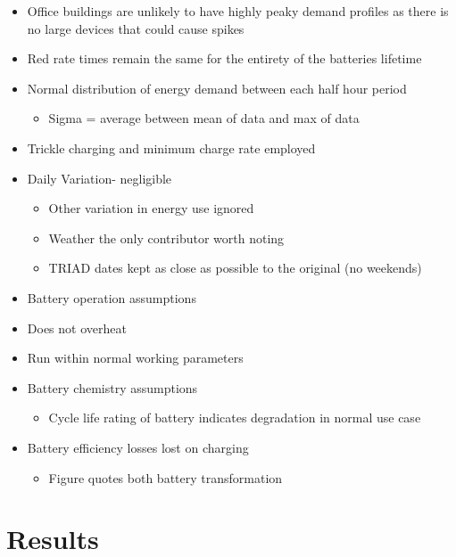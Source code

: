 \begin{itemize}
\tightlist
\item
  Office buildings are unlikely to have highly peaky demand profiles as
  there is no large devices that could cause spikes
\item
  Red rate times remain the same for the entirety of the batteries
  lifetime
\item
  Normal distribution of energy demand between each half hour period

  \begin{itemize}
  \tightlist
  \item
    Sigma = average between mean of data and max of data
  \end{itemize}
\item
  Trickle charging and minimum charge rate employed
\item
  Daily Variation- negligible

  \begin{itemize}
  \tightlist
  \item
    Other variation in energy use ignored
  \item
    Weather the only contributor worth noting
  \item
    TRIAD dates kept as close as possible to the original (no
    weekends)\\
  \end{itemize}
\item
  Battery operation assumptions
\item
  Does not overheat
\item
  Run within normal working parameters
\item
  Battery chemistry assumptions

  \begin{itemize}
  \tightlist
  \item
    Cycle life rating of battery indicates degradation in normal use
    case
  \end{itemize}
\item
  Battery efficiency losses lost on charging

  \begin{itemize}
  \tightlist
  \item
    Figure quotes both battery transformation
  \end{itemize}
\end{itemize}

\section{Results}\label{results}


